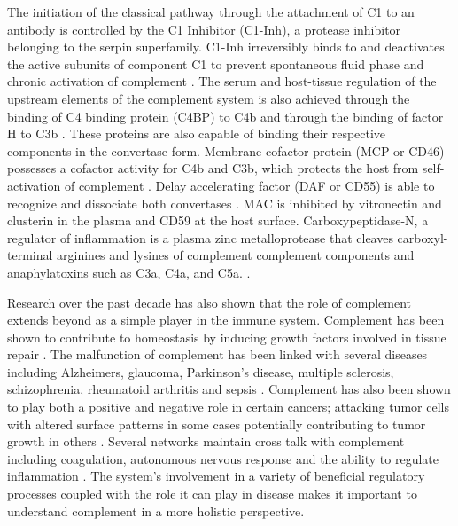 \documentclass[12pt]{article}
\begin{document}
The initiation of the classical pathway through the attachment of C1 to an antibody is controlled by the C1 Inhibitor (C1-Inh), a protease inhibitor belonging to the serpin superfamily. C1-Inh irreversibly binds to and deactivates the active subunits of component C1 to prevent spontaneous fluid phase and chronic activation of complement \cite{walker1995complement}. The serum and host-tissue regulation of the upstream elements of the complement system is also achieved through the binding of C4 binding protein (C4BP) to C4b and through the binding of factor H to C3b \cite{blom2001structural}. These proteins are also capable of binding their respective components in the convertase form. Membrane cofactor protein (MCP or CD46) possesses a cofactor activity for C4b and C3b, which protects the host from self-activation of complement \cite{riley2004cd46}.  Delay accelerating factor (DAF or CD55) is able to recognize and dissociate both convertases \cite{lukacik2004complement}. MAC is inhibited by vitronectin and clusterin in the plasma and CD59 at the host surface.
Carboxypeptidase-N, a regulator of inflammation is a plasma zinc metalloprotease that cleaves carboxyl-terminal arginines and lysines of complement complement components and  anaphylatoxins such as C3a, C4a, and C5a.
\cite{liszewski1995control}.

Research over the past decade has also shown that the role of complement extends beyond as a simple player in the immune system. Complement has been shown to contribute to homeostasis by inducing growth factors involved in tissue repair \cite{ricklin2010complement}. The malfunction of complement has been linked with several diseases including Alzheimers, glaucoma, Parkinson's disease, multiple sclerosis, schizophrenia, rheumatoid arthritis and sepsis \cite{ricklin2007complement, rittirsch2008harmful}. Complement has also been shown to play both a positive and negative role in certain cancers; attacking tumor cells with altered surface patterns in some cases potentially contributing to tumor growth in others \cite{sarma2011complement, ricklin2013complement}. Several networks maintain cross talk with complement including coagulation, autonomous nervous response and the ability to regulate inflammation \cite{ricklin2013complement}. The system's involvement in a variety of beneficial regulatory processes coupled with the role it can play in disease makes it important to understand complement in a more holistic perspective.
\end{document}
